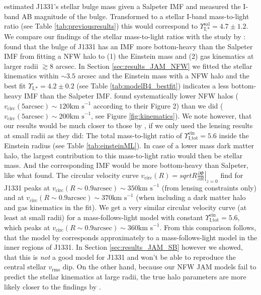 \citet{SWELLSI} estimated J1331's stellar bulge mass given a Salpeter IMF and measured the I-band AB magnitude of the bulge. Transformed to a stellar I-band mass-to-light ratio (see Table \ref{tab:previousresults}) this would correspond to $\Upsilon_\text{I,*}^\text{sal} = 4.7 \pm 1.2$.\\

We compare our findings of the stellar mass-to-light ratios with the study by \cite{SWELLSV}: \cite{SWELLSV} found that the bulge of J1331 has an IMF more bottom-heavy than the Salpeter IMF from fitting a NFW halo to (1) the Einstein mass and (2) gas kinematics at larger radii $\gtrsim 8$ arcsec. In Section \ref{sec:results_JAM_NFW} we fitted the stellar kinematics within $\sim 3.5$ arcsec and the Einstein mass with a NFW halo and the best fit $\Upsilon_\text{I,*} = 4.2 \pm 0.2$ (see Table \ref{tab:modelB4_bestfit}) indicates a less bottom-heavy IMF than the Salpeter IMF. \cite{SWELLSV}  found systematically lower NFW halos ($v_\text{circ}(5\text{arcsec}) \sim 120 \text{km s}^{-1}$ according to their Figure 2) than we did ($v_\text{circ}(5\text{arcsec}) \sim 200 \text{km s}^{-1}$, see Figure \ref{fig:kinematics}). We note however, that our results would be much closer to those by \citet{SWELLSV}, if we only used the lensing results at small radii as they did: The total mass-to-light ratio of $\Upsilon_\text{I,tot}^\text{ein} = 5.6$ inside the Einstein radius (see Table \ref{tab:einsteinML}). In case of a lower mass dark matter halo, the largest contribution to this mass-to-light ratio would then be stellar mass. And the corresponding IMF would be more bottom-heavy than Salpeter,  like what \citet{SWELLSV} found. The circular velocity curve $v_\text{circ}(R) = \left. sqrt{R \frac{\partial \Phi}{\partial R}} \right|_{z=0}$ \citet{SWELLSV} find for J1331 peaks at $v_\text{circ}(R\sim0.9 \text{arcsec}) \sim 350 \text{km s}^{-1}$ (from lensing constraints only) and at $v_\text{circ}(R\sim0.9 \text{arcsec}) \sim 370 \text{km s}^{-1}$ (when including a dark matter halo and gas kinematics in the fit). We get a very similar circular velocity curve (at least at small radii) for a mass-follows-light model with constant $\Upsilon_\text{I,tot}^\text{ein} = 5.6$, which peaks at $v_\text{circ}(R\sim0.9 \text{arcsec}) \sim 360 \text{km s}^{-1}$. From this comparison follows, that the model by \citet{SWELLSV} corresponds approximately to a mass-follows-light model in the inner regions of J1331. In Section \ref{sec:results_JAM_SB} however we showed, that this is \emph{not} a good model for J1331 and won't be able to reproduce the central stellar $v_\text{rms}$ dip. On the other hand, because our NFW JAM models fail to predict the stellar kinematics at large radii, the true halo parameters are more likely closer to the findings by \citet{SWELLSV}.\\

